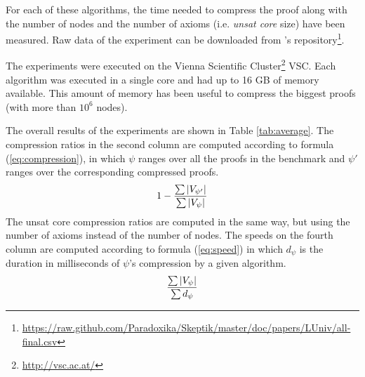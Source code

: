 \documentclass{easychair}
\begin{document}
%



For each of these algorithms, the time needed to compress the proof along with the number of nodes
and the number of axioms (i.e. \emph{unsat core} size) have been measured. Raw data of the experiment can be downloaded from {\skeptik}'s repository\footnote{\url{https://raw.github.com/Paradoxika/Skeptik/master/doc/papers/LUniv/all-final.csv}}.

The experiments were executed on the Vienna Scientific Cluster\footnote{\url{http://vsc.ac.at/}}
VSC. Each algorithm was executed in a single core and had up to 16 GB of memory available. This amount of memory has been useful to compress the biggest proofs (with more than $10^6$ nodes).


The overall results of the experiments are shown in Table \ref{tab:average}. The compression ratios
in the second column are computed according to formula (\ref{eq:compression}), in which $\psi$
ranges over all the proofs in the benchmark and $\psi'$ ranges over the corresponding compressed
proofs.
\begin{equation} \label{eq:compression}
  1 - \frac{ \sum {|V_{\psi'}|} }{ \sum {|V_{\psi}|} }
\end{equation}
The unsat core compression ratios are computed in the same way, but using the number of axioms instead of
the number of nodes. The speeds on the fourth column are computed according to formula
(\ref{eq:speed}) in which $d_{\psi}$ is the duration in milliseconds of $\psi$'s compression by a
given algorithm.
\begin{equation} \label{eq:speed}
  \frac{ \sum {|V_{\psi}|} }{ \sum {d_{\psi}} }
\end{equation}
\end{document}
